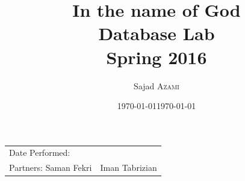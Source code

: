 \documentclass{article}
\title{In the name of God \\ Database Lab \\ Spring 2016} %
\author{Sajad \textsc{Azami}} %
\date{\today} %
\begin{document}
\maketitle %

\begin{center}
	\begin{tabular}{l r}
		Date Performed: & \date{\today} \\ %
		Partners: Saman Fekri & Iman Tabrizian\\ %
	\end{tabular}
\end{center}


\end{document}
